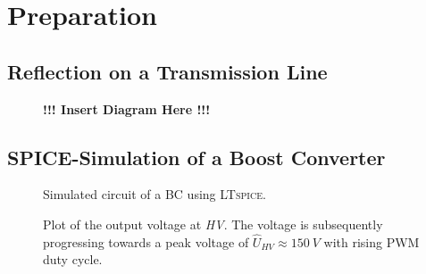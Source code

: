 \section{Preparation}
%
    \subsection{Reflection on a Transmission Line}\label{sec:A1_reflection_on_transmission_line}
        \begin{figure}[h]
            \centering
            \begin{framed}
                \textbf{!!! Insert Diagram Here !!!}
            \end{framed}
        \end{figure}
    \subsection{SPICE-Simulation of a Boost Converter}\label{sec:A2_spice_boost}
        \begin{figure}[H]
            \centering
            
            \caption[Simulated circuit of a BC.]{Simulated circuit of a BC using \textsc{LTspice}.}
            \label{fig:simCircuit}
        \end{figure}
        \begin{figure}[H]
            \centering
            
            \caption[Simulated output voltages at various duty cycles]{Plot of the output voltage at \textit{HV}. The voltage is subsequently progressing towards a peak voltage of \( \hat{U}_{HV} \approx \SI{150}{V} \) with rising PWM duty cycle.}
            \label{fig:plotSimCircuit}
        \end{figure}
